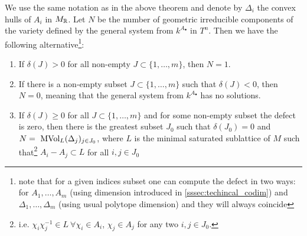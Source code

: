 \begin{theorem}\label{thm:khovanskii_components}
    We use the same notation as in the above theorem and denote by $\Delta_i$ the convex hulls of $A_i$ in $M_{\mathbb R}$. Let $N$ be the number of geometric irreducible components of the variety defined by the general system from $k^{A_\bullet}$ in $T^n$. Then we have the following alternative\footnote{note that for a given indices subset one can compute the defect in two ways: for $A_1, \dots, A_m$ (using dimension introduced in \autoref{sssec:techincal_codim}) and $\Delta_1, \dots, \Delta_m$ (using usual polytope dimension) and they will always coincide}:
    \begin{enumerate}
        \item If $\delta(J) > 0$ for all non-empty $J \subset \{1, \dots, m \}$, then $N = 1$.

        \item If there is a non-empty subset  $J \subset \{1, \dots, m \}$ such that $\delta(J) < 0$, then $N = 0$, meaning that the general system from $k^{A_\bullet}$ has no solutions.

        \item If $\delta(J) \ge 0$ for all $J \subset \{ 1, \dots, m \}$ and for some non-empty subset the defect is zero, then there is the greatest subset $J_0$ such that $\delta(J_0) = 0$ and $N =~\operatorname{MVol}_L (\Delta_j)_{j \in J_0}$, where $L$ is the minimal saturated sublattice of $M$ such that\footnote{i.e. $\chi_i \chi_j^{-1} \in L \ \forall \chi_i \in A_i$, $\chi_j \in A_j$ for any two $i, j \in J_0$.} $A_i - A_j \subset L$ for all $i, j \in J_0$
    \end{enumerate}
\end{theorem}

